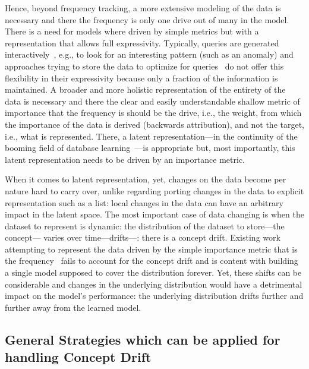 Hence, beyond frequency tracking, a more extensive modeling of the data is necessary and there the frequency is only one drive out of many in the model. There is a need for models where driven by simple metrics but with a representation that allows full expressivity. Typically, queries are generated interactively~\cite{kraska2021northstar}, e.g., to look for an interesting pattern (such as an anomaly) and approaches trying to store the data to optimize for queries~\cite{zhao2021cluster,zhang2021cocosketch} do not offer this flexibility in their expressivity because only a fraction of the information is maintained. A broader and more holistic representation of the entirety of the data is necessary and there the clear and easily understandable shallow metric of importance that the frequency is should be the drive, i.e., the weight, from which the importance of the data is derived (backwards attribution), and not the target, i.e., what is represented. There, a latent representation---in the continuity of the booming field of database learning~\cite{hilprecht2019deepdb,hasan2020deep}---is appropriate but, most importantly, this latent representation needs to be driven by an importance metric.


When it comes to latent representation, yet, changes on the data become per nature hard to carry over, unlike regarding porting changes in the data to explicit representation such as a list: local changes in the data can have an arbitrary impact in the latent space. The most important case of data changing is when the dataset to represent is dynamic: the distribution of the dataset to store---the concept--- varies over time---drifts---: there is a concept drift.
%
Existing work attempting to represent the data driven by the simple importance metric that is the frequency~\cite{hsu2019learning} fails to account for the concept drift and is content with building a single model supposed to cover the distribution forever.
%
Yet, these shifts can be considerable and changes in the underlying distribution would have a detrimental impact on the model's performance: the underlying distribution drifts further and further away from the learned model.


\subsection{General Strategies which can be applied for handling Concept Drift}

